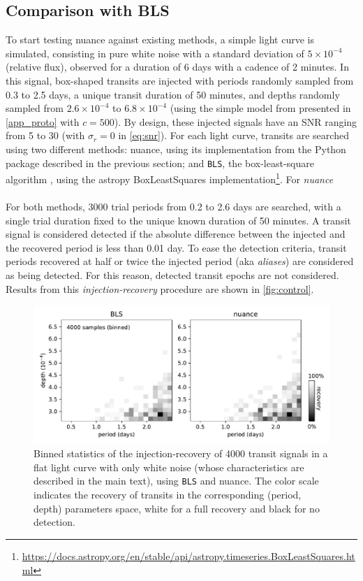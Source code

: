 \documentclass{aastex631}
\newcommand{\nuancemethod}{\textit{nuance}}
\newcommand{\nuance}{\nuancemethod{}}
\newcommand{\footlink}[1]{\footnote{\url{#1}}}
\begin{document}
\subsection{Comparison with BLS}\label{control}

To start testing \textsf{nuance} against existing methods, a simple light curve is simulated, consisting in pure white noise with a standard deviation of $5\times 10^{-4}$ (relative flux), observed for a duration of 6 days with a cadence of 2 minutes.
In this signal, box-shaped transits are injected with periods randomly sampled from 0.3 to 2.5 days, a unique transit duration of 50 minutes, and depths randomly sampled from $2.6 \times 10^{-4}$ to $6.8 \times 10^{-4}$ (using the simple model from \cite{protopapas} presented in \autoref{app_proto} with $c=500$). By design, these injected signals have an SNR ranging from 5 to 30 (with $\sigma_r = 0$ in \autoref{eq:snr}). For each light curve, transits are searched using two different methods: \textsf{nuance}, using its implementation from the Python package described in the previous section; and \texttt{BLS}, the box-least-square algorithm \citep{bls}, using the \textsf{astropy} \textsf{BoxLeastSquares} implementation\footlink{https://docs.astropy.org/en/stable/api/astropy.timeseries.BoxLeastSquares.html}. For \nuance{}\\\\
For both methods, 3000 trial periods from 0.2 to 2.6 days are searched, with a single trial duration fixed to the unique known duration of 50 minutes. A transit signal is considered detected if the absolute difference between the injected and the recovered period is less than 0.01 day. To ease the detection criteria, transit periods recovered at half or twice the injected period (aka \textit{aliases}) are considered as being detected. For this reason, detected transit epochs are not considered. Results from this \textit{injection-recovery} procedure are shown in \autoref{fig:control}.

\begin{figure}[H]
    \begin{centering}
        \includegraphics[width=0.85\linewidth]{../workflows/control_test_bls/figures/control_test.pdf}
        \caption{Binned statistics of the injection-recovery of 4000 transit signals in a flat light curve with only white noise (whose characteristics are described in the main text), using \texttt{BLS} and \textsf{nuance}. The color scale indicates the recovery of transits in the corresponding (period, depth) parameters space, white for a full recovery and black for no detection.}
        \label{fig:control}
    \end{centering}
\end{figure}
\end{document}
